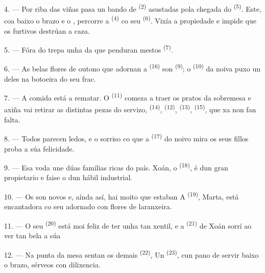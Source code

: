4. --- Por riba das viñas pasa un bando de  \textsuperscript{(2)}
asustadas pola chegada do  \textsuperscript{(5)}. Este, coa
 baixo o brazo e o , percorre
a  \textsuperscript{(4)} co seu  \textsuperscript{(6)}.
Vixía a propiedade e impide que os furtivos destrúan a caza.

5. --- Fóra do  trepa unha  da que penduran
mestos  \textsuperscript{(7)}.

6. --- As belas flores de outono que adornan a  \textsuperscript{(16)}
son  \textsuperscript{(9)}; o 
\textsuperscript{(10)} da noiva puxo un deles na botoeira do seu frac.

7. --- A comida está a rematar. O  \textsuperscript{(11)} comeza a
traer os pratos da sobremesa e axiña vai retirar as distintas pezas do servizo,
 \textsuperscript{(14)},  \textsuperscript{(12)},
 \textsuperscript{(13)},  \textsuperscript{(15)}, que
xa non fan falta.

\VUsaut{3.0mm}

8. --- Todos parecen ledos, e o sorriso co que a  \textsuperscript{(17)}
do noivo mira os seus fillos proba a súa felicidade.

9. --- Esa voda une dúas familias ricas do país. Xoán, o 
\textsuperscript{(18)}, é  dun gran propietario e faise o
 dun hábil industrial.

10. --- Os  son novos e, aínda así, hai moito que estaban
 A  \textsuperscript{(19)}, Marta, está
encantadora co seu  adornado con flores de laranxeira.

11. --- O seu  \textsuperscript{(20)} está moi feliz de ter unha
 tan xentil, e a  \textsuperscript{(21)} de Xoán sorrí ao
ver tan bela a súa 

12. --- Na punta da mesa sentan os demais  \textsuperscript{(22)},
 Un 
\textsuperscript{(23)}, cun pano de servir baixo o brazo, sérveos con dilixencia.

